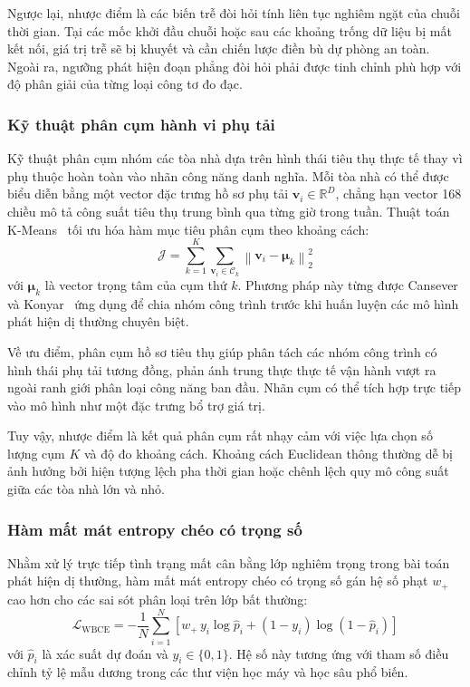 Ngược lại, nhược điểm là các biến trễ đòi hỏi tính liên tục nghiêm ngặt của chuỗi thời gian. Tại các mốc khởi đầu chuỗi hoặc sau các khoảng trống dữ liệu bị mất kết nối, giá trị trễ sẽ bị khuyết và cần chiến lược điền bù dự phòng an toàn. Ngoài ra, ngưỡng phát hiện đoạn phẳng đòi hỏi phải được tinh chỉnh phù hợp với độ phân giải của từng loại công tơ đo đạc.

\subsubsection{Kỹ thuật phân cụm hành vi phụ tải}

Kỹ thuật phân cụm nhóm các tòa nhà dựa trên hình thái tiêu thụ thực tế thay vì phụ thuộc hoàn toàn vào nhãn công năng danh nghĩa. Mỗi tòa nhà có thể được biểu diễn bằng một vector đặc trưng hồ sơ phụ tải $\mathbf{v}_i \in \mathbb{R}^{D}$, chẳng hạn vector 168 chiều mô tả công suất tiêu thụ trung bình qua từng giờ trong tuần. Thuật toán K-Means~\cite{kmeans} tối ưu hóa hàm mục tiêu phân cụm theo khoảng cách:
\begin{equation*}
    \mathcal{J} = \sum_{k=1}^{K} \sum_{\mathbf{v}_i \in \mathcal{C}_k} \left\| \mathbf{v}_i - \boldsymbol{\mu}_k \right\|_2^2
\end{equation*}
với $\boldsymbol{\mu}_k$ là vector trọng tâm của cụm thứ $k$. Phương pháp này từng được Cansever và Konyar~\cite{cansever2026} ứng dụng để chia nhóm công trình trước khi huấn luyện các mô hình phát hiện dị thường chuyên biệt.

Về ưu điểm, phân cụm hồ sơ tiêu thụ giúp phân tách các nhóm công trình có hình thái phụ tải tương đồng, phản ánh trung thực thực tế vận hành vượt ra ngoài ranh giới phân loại công năng ban đầu. Nhãn cụm có thể tích hợp trực tiếp vào mô hình như một đặc trưng bổ trợ giá trị.

Tuy vậy, nhược điểm là kết quả phân cụm rất nhạy cảm với việc lựa chọn số lượng cụm $K$ và độ đo khoảng cách. Khoảng cách Euclidean thông thường dễ bị ảnh hưởng bởi hiện tượng lệch pha thời gian hoặc chênh lệch quy mô công suất giữa các tòa nhà lớn và nhỏ.

\subsubsection{Hàm mất mát entropy chéo có trọng số}

Nhằm xử lý trực tiếp tình trạng mất cân bằng lớp nghiêm trọng trong bài toán phát hiện dị thường, hàm mất mát entropy chéo có trọng số gán hệ số phạt $w_+$ cao hơn cho các sai sót phân loại trên lớp bất thường:
\begin{equation*}
    \mathcal{L}_{\text{WBCE}} = -\frac{1}{N}\sum_{i=1}^{N}\left[ w_{+}\, y_i \log \hat{p}_i + (1 - y_i)\log\left(1 - \hat{p}_i\right)\right]
\end{equation*}
với $\hat{p}_i$ là xác suất dự đoán và $y_i \in \{0, 1\}$. Hệ số này tương ứng với tham số điều chỉnh tỷ lệ mẫu dương trong các thư viện học máy và học sâu phổ biến.

